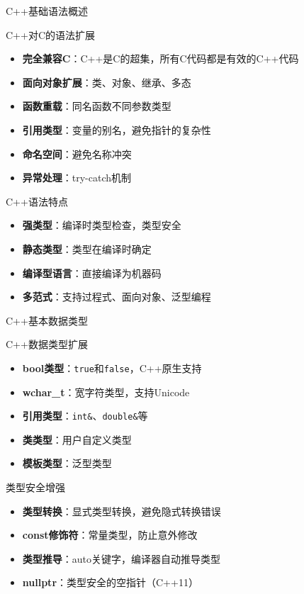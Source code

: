 \documentclass[UTF8,aspectratio=169]{beamer}
\begin{document}
\begin{frame}{C++基础语法概述}
    \begin{ytublock}{C++对C的语法扩展}
        \begin{itemize}
            \item \textbf{完全兼容C}：C++是C的超集，所有C代码都是有效的C++代码
            \item \textbf{面向对象扩展}：类、对象、继承、多态
            \item \textbf{函数重载}：同名函数不同参数类型
            \item \textbf{引用类型}：变量的别名，避免指针的复杂性
            \item \textbf{命名空间}：避免名称冲突
            \item \textbf{异常处理}：try-catch机制
        \end{itemize}
    \end{ytublock}

    \begin{ytublock}{C++语法特点}
        \begin{itemize}
            \item \textbf{强类型}：编译时类型检查，类型安全
            \item \textbf{静态类型}：类型在编译时确定
            \item \textbf{编译型语言}：直接编译为机器码
            \item \textbf{多范式}：支持过程式、面向对象、泛型编程
        \end{itemize}
    \end{ytublock}
\end{frame}

\begin{frame}{C++基本数据类型}
    \begin{ytublock}{C++数据类型扩展}
        \begin{itemize}
            \item \textbf{bool类型}：\texttt{true}和\texttt{false}，C++原生支持
            \item \textbf{wchar\_t}：宽字符类型，支持Unicode
            \item \textbf{引用类型}：\texttt{int\&}、\texttt{double\&}等
            \item \textbf{类类型}：用户自定义类型
            \item \textbf{模板类型}：泛型类型
        \end{itemize}
    \end{ytublock}

    \begin{ytublock}{类型安全增强}
        \begin{itemize}
            \item \textbf{类型转换}：显式类型转换，避免隐式转换错误
            \item \textbf{const修饰符}：常量类型，防止意外修改
            \item \textbf{类型推导}：auto关键字，编译器自动推导类型
            \item \textbf{nullptr}：类型安全的空指针（C++11）
        \end{itemize}
    \end{ytublock}
\end{frame}
\end{document}
